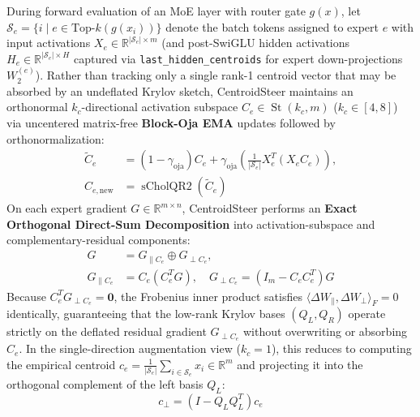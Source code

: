 \documentclass[10pt,twocolumn,letterpaper]{article}
\begin{document}
During forward evaluation of an MoE layer with router gate $g(x)$, let $\mathcal{S}_e = \{i \mid e \in \text{Top-}k(g(x_i))\}$ denote the batch tokens assigned to expert $e$ with input activations $X_e \in \mathbb{R}^{|\mathcal{S}_e| \times m}$ (and post-SwiGLU hidden activations $H_e \in \mathbb{R}^{|\mathcal{S}_e| \times H}$ captured via \texttt{last\_hidden\_centroids} for expert down-projections $W_2^{(e)}$). Rather than tracking only a single rank-1 centroid vector that may be absorbed by an undeflated Krylov sketch, CentroidSteer maintains an orthonormal $k_c$-directional activation subspace $C_e \in \operatorname{St}(k_c, m)$ ($k_c \in [4, 8]$) via uncentered matrix-free \textbf{Block-Oja EMA} updates followed by orthonormalization:
\begin{equation}
\begin{aligned}
    \tilde{C}_e &= (1 - \gamma_{\text{oja}}) C_e + \gamma_{\text{oja}} \left(\frac{1}{|\mathcal{S}_e|} X_e^T (X_e C_e)\right), \\
    C_{e,\text{new}} &= \operatorname{sCholQR2}(\tilde{C}_e)
\end{aligned}
\end{equation}
On each expert gradient $G \in \mathbb{R}^{m \times n}$, CentroidSteer performs an \textbf{Exact Orthogonal Direct-Sum Decomposition} into activation-subspace and complementary-residual components:
\begin{equation}
\begin{aligned}
    G &= G_{\parallel C_e} \oplus G_{\perp C_e}, \\
    G_{\parallel C_e} &= C_e (C_e^T G), \quad G_{\perp C_e} = (I_m - C_e C_e^T) G
\end{aligned}
\end{equation}
Because $C_e^T G_{\perp C_e} = \mathbf{0}$, the Frobenius inner product satisfies $\langle \Delta W_{\parallel}, \Delta W_{\perp} \rangle_F = 0$ identically, guaranteeing that the low-rank Krylov bases $(Q_L, Q_R)$ operate strictly on the deflated residual gradient $G_{\perp C_e}$ without overwriting or absorbing $C_e$. In the single-direction augmentation view ($k_c = 1$), this reduces to computing the empirical centroid $c_e = \frac{1}{|\mathcal{S}_e|} \sum_{i \in \mathcal{S}_e} x_i \in \mathbb{R}^m$ and projecting it into the orthogonal complement of the left basis $Q_L$:
\begin{equation}
    c_\perp = (I - Q_L Q_L^T) c_e
\end{equation}
\end{document}
